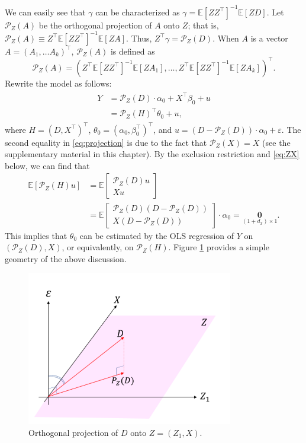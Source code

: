 \documentclass[10.5pt, A4paper, openany, uplatex]{book}
\newcommand{\mbf}{\mathbf}
\newcommand{\mcl}{\mathcal}
\newcommand{\eps}{\varepsilon}
\newcommand{\E}{\mathbb{E}}
\numberwithin{equation}{section}
\begin{document}
We can easily see that $\gamma$ can be characterized as $\gamma = \E[ZZ^\top]^{-1}\E[Z D]$.
Let $\mcl{P}_Z(A)$ be the orthogonal projection of $A$ onto $Z$; that is, $\mcl{P}_Z(A) \equiv Z^\top \E[ZZ^\top]^{-1}\E[Z A]$.
Thus, $Z^\top\gamma = \mcl{P}_Z(D)$.
When $A$ is a vector $A = (A_1, \ldots A_k)^\top$, $\mcl{P}_Z(A)$ is defined as 
\[
	\mcl{P}_Z(A) = (Z^\top \E[Z Z^\top]^{-1} \E[ZA_1], \ldots , Z^\top \E[Z Z^\top]^{-1} \E[ZA_k])^\top.
\]
Rewrite the model as follows:
\begin{align}\label{eq:projection}
\begin{split}
	Y 
	& = \mcl{P}_Z(D) \cdot \alpha_0 + X^\top \beta_0 +u \\
	& = \mcl{P}_Z(H)^\top \theta_0 + u ,
\end{split}
\end{align}
where $H = (D, X^\top)^\top$, $\theta_0 = (\alpha_0, \beta_0^\top)^\top$, and $u = (D - \mcl{P}_Z(D)) \cdot \alpha_0 + \eps$.
The second equality in \eqref{eq:projection} is due to the fact that $\mcl{P}_Z(X) = X$ (see the supplementary material in this chapter).
By the exclusion restriction and \eqref{eq:ZX} below, we can find that 
\begin{align*}
	\E[\mcl{P}_Z(H) u] 
	& = \E\left[
	\begin{array}{c}
	\mcl{P}_Z(D) u \\
	X u
	\end{array}
	\right] \\
		& = \E\left[
	\begin{array}{c}
	\mcl{P}_Z(D) (D - \mcl{P}_Z(D))  \\
	X (D - \mcl{P}_Z(D))
	\end{array}
	\right] \cdot \alpha_0  = \underset{(1 + d_x) \times 1}{\mbf{0}}.
\end{align*}
This implies that $\theta_0$ can be estimated by the OLS regression of $Y$ on $(\mcl{P}_Z(D), X)$, or equivalently, on $\mcl{P}_Z(H)$.
Figure \ref{fig:geo2sls} provides a simple geometry of the above discussion.

\begin{figure}[h!]
	\begin{center}
		\includegraphics[width = 9cm]{projection.png}
		\caption{Orthogonal projection of $D$ onto $Z = (Z_1, X)$.}
		\label{fig:geo2sls}
	\end{center}
\end{figure}
\end{document}
